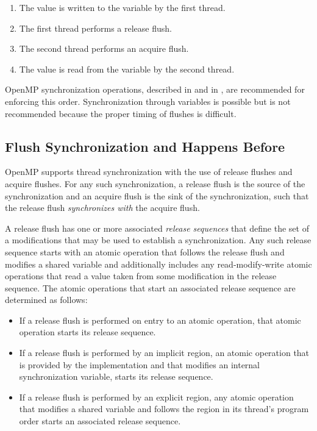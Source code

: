 \begin{enumerate}
    \item The value is written to the variable by the first thread.
    \item The first thread performs a release flush.
    \item The second thread performs an acquire flush.
    \item The value is read from the variable by the second thread.
\end{enumerate}

\begin{note}
OpenMP synchronization operations, described in 
 and in , 
are recommended for enforcing this order. Synchronization 
through variables is possible but is not recommended because the proper timing
of flushes is difficult.
\end{note}


\subsection{Flush Synchronization and Happens Before}
\label{subsec:happens-before}

OpenMP supports thread synchronization with the use of release flushes and
acquire flushes. For any such synchronization, a release flush is the source
of the synchronization and an acquire flush is the sink of the
synchronization, such that the release flush \emph{synchronizes with} the
acquire flush.

A release flush has one or more associated \emph{release sequences} that
define the set of a modifications that may be used to establish a
synchronization. Any such release sequence starts with an atomic operation
that follows the release flush and modifies a shared variable and additionally
includes any read-modify-write atomic operations that read a value taken from
some modification in the release sequence. The atomic operations that start an
associated release sequence are determined as follows:

\begin{itemize}
\item If a release flush is performed on entry to an atomic operation, that
    atomic operation starts its release sequence.
\item If a release flush is performed by an implicit  region, an 
    atomic operation that is provided by the implementation and that modifies
    an internal synchronization variable, starts its release sequence.
\item If a release flush is performed by an explicit  region, any
    atomic operation that modifies a shared variable and follows the
     region in its thread's program order starts an associated
    release sequence.
\end{itemize}

